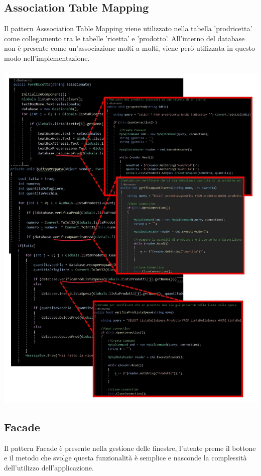 \documentclass[a4paper, titlepage]{article}
\begin{document}
\subsection{Association Table Mapping}
Il pattern Asssociation Table Mapping viene utilizzato nella tabella 'prodricetta' come collegamento tra le tabelle 'ricetta' e 'prodotto'. All'interno del database non è presente come un'associazione molti-a-molti, viene però utilizzata in questo modo nell'implementazione.\\\\ 
\includegraphics[scale=0.40]{Immagini/AssociationTableMapping_.jpg}
\subsection{Facade}
Il pattern Facade è presente nella gestione delle finestre, l'utente preme il bottone e il metodo che svolge questa funzionalità è semplice e nasconde la complessità dell'utilizzo dell'applicazione.
\newpage
\end{document}

